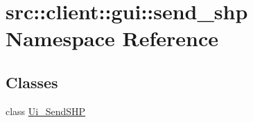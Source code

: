 \hypertarget{namespacesrc_1_1client_1_1gui_1_1send__shp}{
\section{src::client::gui::send\_\-shp Namespace Reference}
\label{namespacesrc_1_1client_1_1gui_1_1send__shp}
}
\subsection*{Classes}
\begin{DoxyCompactItemize}
\item 
class \hyperlink{classsrc_1_1client_1_1gui_1_1send__shp_1_1Ui__SendSHP}{Ui\_\-SendSHP}
\end{DoxyCompactItemize}
